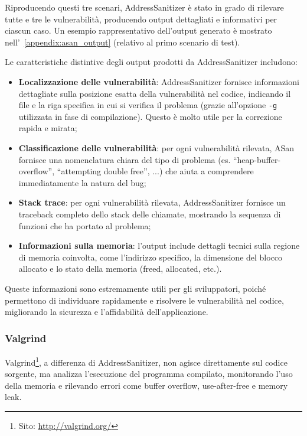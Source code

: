 Riproducendo questi tre scenari, AddressSanitizer è stato in grado di rilevare tutte
e tre le vulnerabilità, producendo output dettagliati e informativi per ciascun
caso. Un esempio rappresentativo dell'output generato è mostrato nell'~\autoref{appendix:asan_output}
(relativo al primo scenario di test).

Le caratteristiche distintive degli output prodotti da AddressSanitizer
includono:
\begin{itemize}
  \item \textbf{Localizzazione delle vulnerabilità}: AddressSanitizer fornisce informazioni
    dettagliate sulla posizione esatta della vulnerabilità nel codice, indicando
    il file e la riga specifica in cui si verifica il problema (grazie all'opzione
    \texttt{-g} utilizzata in fase di compilazione). Questo è molto utile per la
    correzione rapida e mirata;

  \item \textbf{Classificazione delle vulnerabilità}: per ogni vulnerabilità rilevata,
    ASan fornisce una nomenclatura chiara del tipo di problema (es. ``heap-buffer-overflow'',
    ``attempting double free'', ...) che aiuta a comprendere immediatamente la natura
    del bug;

  \item \textbf{Stack trace}: per ogni vulnerabilità rilevata, AddressSanitizer
    fornisce un traceback completo dello stack delle chiamate, mostrando la sequenza
    di funzioni che ha portato al problema;

  \item \textbf{Informazioni sulla memoria}: l'output include dettagli tecnici sulla
    regione di memoria coinvolta, come l'indirizzo specifico, la dimensione del blocco
    allocato e lo stato della memoria (freed, allocated, etc.).
\end{itemize}

Queste informazioni sono estremamente utili per gli sviluppatori, poiché permettono
di individuare rapidamente e risolvere le vulnerabilità nel codice, migliorando
la sicurezza e l'affidabilità dell'applicazione.

\subsubsection*{Valgrind}
Valgrind\footnote{Sito: \url{http://valgrind.org/}},
a differenza di AddressSanitizer, non agisce direttamente sul codice sorgente,
ma analizza l'esecuzione del programma compilato, monitorando l'uso della memoria
e rilevando errori come buffer overflow, use-after-free e memory leak.


